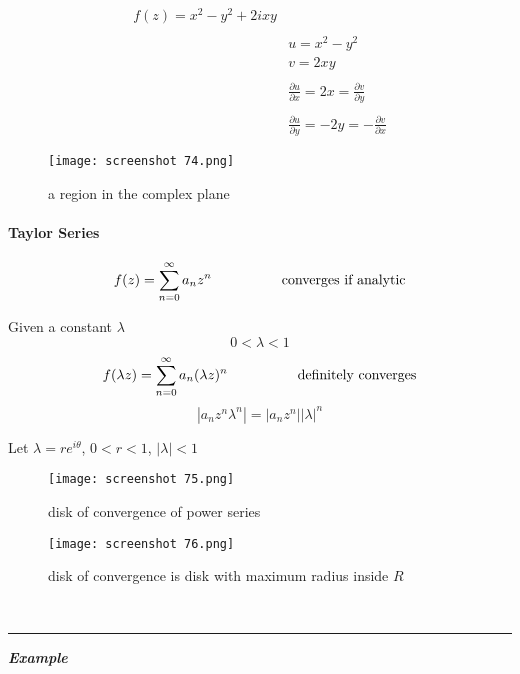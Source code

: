 \documentclass[svgnames]{article}   	%
\begin{document}
\begin{align*}
  f(z) = x^2 - y^2 + 2i xy \\\\
  &u = x^2 - y^2 \\
  &v = 2xy \\\\
  &\frac{\partial u}{\partial x} = 2x = \frac{\partial v}{\partial y} \\\\
  &\frac{\partial u}{\partial y} = -2y = - \frac{\partial v}{\partial x} 
\end{align*}

\begin{figure}[H]
  \centering
    \texttt{[image: screenshot 74.png]}
    \caption{a region in the complex plane}
\end{figure}



\paragraph{Taylor Series}

\[
  f(z) = \sum_{n=0}^{\infty} a_n z^n \hspace{50px} \text{converges if analytic}
\]

Given a constant $\lambda$
\[
0 < \lambda < 1
\]
\[
f(\lambda z) = \sum_{n=0}^{\infty} a_n (\lambda z)^n \hspace{50px}
\text{definitely converges}
\]
\[
| a_n z^n \lambda^n | = |a_n z^n | |\lambda|^n 
\]

Let $\lambda = re^{i\theta}$, $0 < r < 1$,  $|\lambda| < 1$


\begin{figure}[H]
  \centering
    \texttt{[image: screenshot 75.png]}
    \caption{disk of convergence of power series}
\end{figure}

\begin{figure}[H]
  \centering
    \texttt{[image: screenshot 76.png]}
    \caption{disk of convergence is disk with maximum radius inside $R$}
\end{figure}





\mbox{} \\
\hrule
\vspace{10px} 
\textit{ \textbf{Example}}
\end{document}
